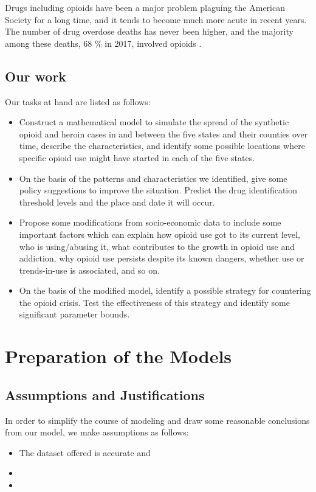 \documentclass[12pt]{article}
\begin{document}
Drugs including opioids have been a major problem plaguing the American Society for a long time, and it tends to become much more acute in recent years. The number of drug overdose deaths has never been higher, and the majority among these deaths, 68 \% in 2017, involved opioids \cite{overdose}. 



\subsection{Our work}
Our tasks at hand are listed as follows:
\begin{itemize}
    \item Construct a mathematical model to simulate the spread of the synthetic opioid and heroin cases in and between the five states and their counties over time, describe the characteristics, and identify some possible locations where specific opioid use might have started in each of the five states. 
    \item On the basis of the patterns and characteristics we identified, give some policy suggestions to improve the situation. Predict the drug identification threshold levels and the place and date it will occur.
    \item Propose some modifications from socio-economic data to include some important factors which can explain how opioid use got to its current level, who is using/abusing it, what contributes to the growth in opioid use and addiction, why opioid use persists despite its known dangers, whether use or trends-in-use is associated, and so on. 
    \item On the basis of the modified model, identify a possible strategy for countering the opioid crisis. Test the effectiveness of this strategy and identify some significant parameter bounds.
\end{itemize}


\section{Preparation of the Models}
\subsection{Assumptions and Justifications}
In order to simplify the course of modeling and draw some reasonable conclusions from our model, we make assumptions as follows:
\begin{itemize}
	\item The dataset offered is accurate and 
	\item 
	\item 
\end{itemize}
\end{document}
